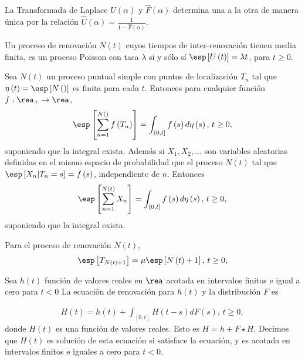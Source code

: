 \begin{Prop}
La Transformada de Laplace $\hat{U}\left(\alpha\right)$ y $\hat{F}\left(\alpha\right)$ determina una a la otra de manera \'unica por la relaci\'on $\hat{U}\left(\alpha\right)=\frac{1}{1-\hat{F}\left(\alpha\right)}$.
\end{Prop}


\begin{Note}
Un proceso de renovaci\'on $N\left(t\right)$ cuyos tiempos de inter-renovaci\'on tienen media finita, es un proceso Poisson con tasa $\lambda$ si y s\'olo s\'i $\esp\left[U\left(t\right)\right]=\lambda t$, para $t\geq0$.
\end{Note}


\begin{Teo}
Sea $N\left(t\right)$ un proceso puntual simple con puntos de localizaci\'on $T_{n}$ tal que $\eta\left(t\right)=\esp\left[N\left(\right)\right]$ es finita para cada $t$. Entonces para cualquier funci\'on $f:\rea_{+}\rightarrow\rea$,
\begin{eqnarray*}
\esp\left[\sum_{n=1}^{N\left(\right)}f\left(T_{n}\right)\right]=\int_{\left(0,t\right]}f\left(s\right)d\eta\left(s\right)\textrm{,  }t\geq0,
\end{eqnarray*}
suponiendo que la integral exista. Adem\'as si $X_{1},X_{2},\ldots$ son variables aleatorias definidas en el mismo espacio de probabilidad que el proceso $N\left(t\right)$ tal que $\esp\left[X_{n}|T_{n}=s\right]=f\left(s\right)$, independiente de $n$. Entonces
\begin{eqnarray*}
\esp\left[\sum_{n=1}^{N\left(t\right)}X_{n}\right]=\int_{\left(0,t\right]}f\left(s\right)d\eta\left(s\right)\textrm{,  }t\geq0,
\end{eqnarray*} 
suponiendo que la integral exista. 
\end{Teo}

\begin{Coro}
Para el proceso de renovaci\'on $N\left(t\right)$,
\begin{eqnarray*}
\esp\left[T_{N\left(t\right)+1}\right]=\mu\esp\left[N\left(t\right)+1\right]\textrm{,  }t\geq0,
\end{eqnarray*}  
\end{Coro}


\begin{Def}
Sea $h\left(t\right)$ funci\'on de valores reales en $\rea$ acotada en intervalos finitos e igual a cero para $t<0$ La ecuaci\'on de renovaci\'on para $h\left(t\right)$ y la distribuci\'on $F$ es

\begin{eqnarray}\label{Ec.Renovacion}
H\left(t\right)=h\left(t\right)+\int_{\left[0,t\right]}H\left(t-s\right)dF\left(s\right)\textrm{,    }t\geq0,
\end{eqnarray}
donde $H\left(t\right)$ es una funci\'on de valores reales. Esto es $H=h+F\star H$. Decimos que $H\left(t\right)$ es soluci\'on de esta ecuaci\'on si satisface la ecuaci\'on, y es acotada en intervalos finitos e iguales a cero para $t<0$.
\end{Def}


